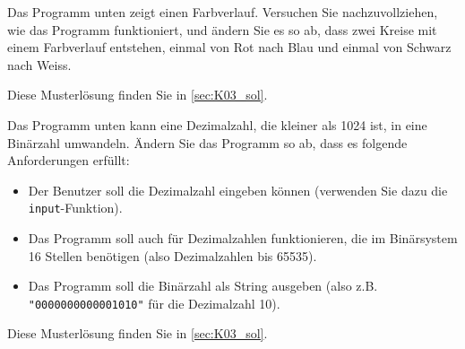 \begin{mychallenge}\label{mychallenge:farbverlauf}
	Das Programm unten zeigt einen Farbverlauf. Versuchen Sie nachzuvollziehen, wie das Programm funktioniert, und ändern Sie es so ab, dass zwei Kreise mit einem Farbverlauf entstehen, einmal von Rot nach Blau und einmal von Schwarz nach Weiss.
	
	\begin{myanswer}
		Diese Musterlösung finden Sie in \cref{sec:K03_sol}.
	\end{myanswer}
\end{mychallenge}


\begin{mychallenge}\label{mychallenge:dez_zu_bin}
	Das Programm unten kann eine Dezimalzahl, die kleiner als 1024 ist, in eine Binärzahl umwandeln. Ändern Sie das Programm so ab, dass es folgende Anforderungen erfüllt:
	\begin{itemize}
		\item Der Benutzer soll die Dezimalzahl eingeben können (verwenden Sie dazu die \lstinline|input|-Funktion).
		\item Das Programm soll auch für Dezimalzahlen funktionieren, die im Binärsystem 16 Stellen benötigen (also Dezimalzahlen bis 65535).
		\item Das Programm soll die Binärzahl als String ausgeben (also z.B. \texttt{"0000000000001010"} für die Dezimalzahl 10).
	\end{itemize}
	
	\begin{myanswer}
		Diese Musterlösung finden Sie in \cref{sec:K03_sol}.
	\end{myanswer}
\end{mychallenge}

